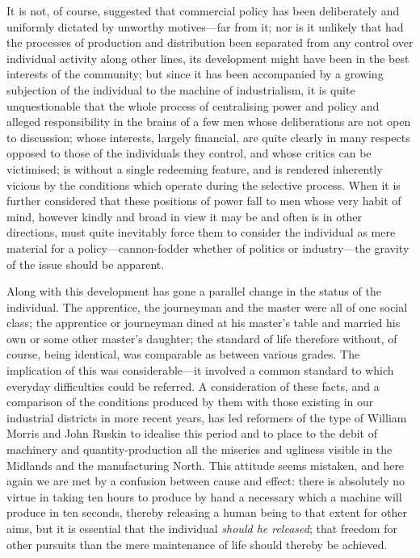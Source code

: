 \documentclass{book}
\begin{document}
It is not, of course, suggested that commercial policy has been deliberately and uniformly dictated by unworthy motives—far from it; nor is it unlikely that had the processes of production and distribution been separated from any control over individual activity along other lines, its development might have been in the best interests of the community; but since it has been accompanied by a growing subjection of the individual to the machine of industrialism, it is quite unquestionable that the whole process of centralising power and policy and alleged responsibility in the brains of a few men whose deliberations are not open to discussion; whose interests, largely financial, are quite clearly in many respects opposed to those of the individuals they control, and whose critics can be victimised; is without a single redeeming feature, and is rendered inherently vicious by the conditions which operate during the selective process. When it is further considered that these positions of power fall to men whose very habit of mind, however kindly and broad in view it may be and often is in other directions, must quite inevitably force them to consider the individual as mere material for a policy—cannon-fodder whether of politics or industry—the gravity of the issue should be apparent.

Along with this development has gone a parallel change in the status of the individual. The apprentice, the journeyman and the master were all of one social class; the apprentice or journeyman dined at his master’s table and married his own or some other master’s daughter; the standard of life therefore without, of course, being identical, was comparable as between various grades. The implication of this was considerable—it involved a common standard to which everyday difficulties could be referred. A consideration of these facts, and a comparison of the conditions produced by them with those existing in our industrial districts in more recent years, has led reformers of the type of William Morris and John Ruskin to idealise this period and to place to the debit of machinery and quantity-production all the miseries and ugliness visible in the Midlands and the manufacturing North. This attitude seems mistaken, and here again we are met by a confusion between cause and effect: there is absolutely no virtue in taking ten hours to produce by hand a necessary which a machine will produce in ten seconds, thereby releasing a human being to that extent for other aims, but it is essential that the individual \emph{should he released}; that freedom for other pursuits than the mere maintenance of life should thereby be achieved.
\end{document}
